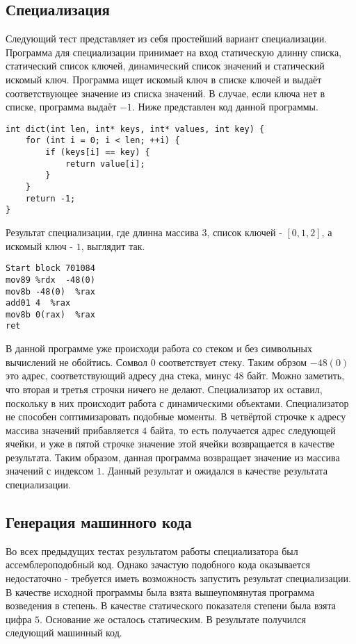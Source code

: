 \documentclass{spbau-diploma}
\begin{document}
\subsection{ Специализация}
Следующий тест представляет из себя простейший вариант специализации. Программа для специализации принимает на вход статическую длинну списка, статический список ключей, динамический список значений и статический искомый ключ. Программа ищет искомый ключ в списке ключей и выдаёт соответствующее значение из списка значений. В случае, если ключа нет в списке, программа выдаёт $-1$. Ниже представлен код данной программы.
\begin{lstlisting}
int dict(int len, int* keys, int* values, int key) {
    for (int i = 0; i < len; ++i) {
        if (keys[i] == key) {
            return value[i];
        }
    }
    return -1;
}
\end{lstlisting}
Результат специализации, где длинна массива $3$, список ключей - $[0, 1, 2]$, а искомый ключ - $1$, выглядит так.
\begin{lstlisting}
Start block 701084
mov89 %rdx  -48(0) 
mov8b -48(0)  %rax 
add01 4  %rax 
mov8b 0(rax)  %rax 
ret
\end{lstlisting}
В данной программе уже происходи работа со стеком и без символьных вычислений не обойтись. Сомвол $0$ соответствует стеку. Таким обрзом $-48(0)$ это адрес, соответствующий адресу дна стека, минус $48$ байт. Можно заметить, что вторая и третья строчки ничего не делают. Специализатор их оставил, поскольку в них происходит работа с динамическими объектами. Специализатор не способен соптимизаровать подобные моменты. В четвёртой строчке к адресу массива значений прибавляется $4$ байта, то есть получается адрес следующей ячейки, и уже в пятой строчке значение этой ячейки возвращается в качестве результата. Таким образом, данная программа возвращает значение из массива значений с индексом $1$. Данный результат и ожидался в качестве результата специализации.

\subsection{ Генерация машинного кода}
Во всех предыдущих тестах результатом работы специализатора был ассемблероподобный код. Однако зачастую подобного кода оказывается недостаточно - требуется иметь возможность запустить результат специализации. В качестве исходной программы была взята вышеупомянутая программа возведения в степень. В качестве статического показателя степени была взята цифра $5$. Основание же осталось статическим. В результате получился следующий машинный код.
\end{document}
